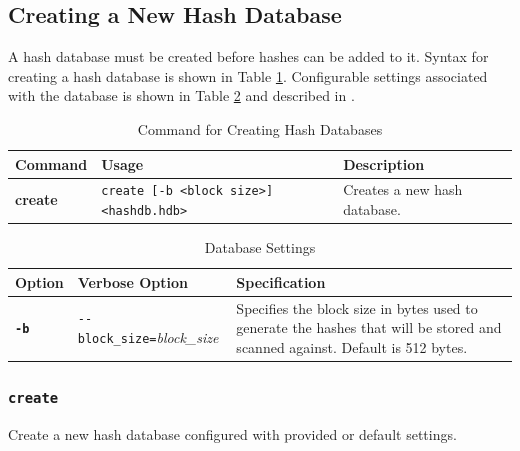 \documentclass[11pt,fleqn]{article} %
\begin{document}
\subsection{Creating a New Hash Database}
\label{Creating}
A hash database must be created before hashes can be added to it.
Syntax for creating a hash database is shown in Table \ref{tab:createDatabase}.
Configurable settings associated with the database is shown in Table \ref{tab:hashDBSettings} and described in \textbf{}.\\
\begin{table}[!ht]
\centering
\caption{Command for Creating Hash Databases}
\label{tab:createDatabase}
\begin{tabular}{|p{2.5 cm}|p{7 cm}|p{4 cm}|}
\hline \hline
\textbf{Command} & \textbf{Usage} & \textbf{Description} \\
\hline
\textbf{create} & \verb+create [-b <block size>]+ \verb+<hashdb.hdb>+ & Creates a new hash database.\\
\hline
\end{tabular}
\end{table}

\begin{table}[!ht]
\centering
\caption{Database Settings}
\label{tab:hashDBSettings}
\begin{tabular}{|p{1.5 cm}|p{8 cm}|p{4 cm}|}
\hline \hline
\textbf{Option} & \textbf{Verbose Option} & \textbf{Specification} \\
\hline
\textbf{\texttt{-b}} & \verb+--block_size=+\textit{block\_size} & Specifies the block size in bytes used to generate the hashes that will be stored and scanned against. Default is 512 bytes.  \\
\hline
\end{tabular}
\end{table}

\subsubsection{\texttt{create}}
Create a new hash database configured with provided or default settings.\\
\end{document}

